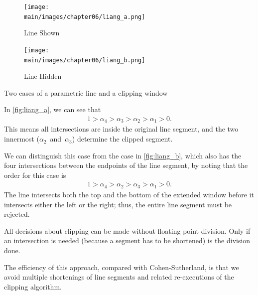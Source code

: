 \documentclass[../COS3712_Notes.tex]{subfiles}
\begin{document}
        \begin{example}
          \begin{center}
            \captionsetup{type=figure}
            \begin{subfigure}{0.4\linewidth}
              \texttt{[image: \\main/images/chapter06/liang\_a.png]}
              \caption{Line Shown}
              \label{fig:liang_a}
            \end{subfigure}
            \begin{subfigure}{0.4\linewidth}
              \texttt{[image: \\main/images/chapter06/liang\_b.png]}
              \caption{Line Hidden}
              \label{fig:liang_b}
            \end{subfigure}
            \caption{Two cases of a parametric line and a clipping window}
          \end{center}

          In \autoref{fig:liang_a}, we can see that
          \begin{align*}
            1 > \alpha_4 > \alpha_3 > \alpha_2 > \alpha_1 > 0.
          \end{align*}
          This means all intersections are inside the original line segment, and the two innermost
          ($\alpha_2$~and~$\alpha_3$) determine the clipped segment.

          We can distinguish this case from the case in \autoref{fig:liang_b},
          which also has the four intersections between the endpoints of the line segment,
          by noting that the order for this case is
          \begin{align*}
            1 > \alpha_4 > \alpha_2 > \alpha_3 > \alpha_1 > 0.
          \end{align*}
          The line intersects both the top and the bottom of the extended window before it
          intersects either the left or the right; thus, the entire line segment must be
          rejected.
        \end{example}

        All decisions about clipping can be made without floating point division.
        Only if an intersection is needed (because a segment has to be shortened)
        is the division done.

        The efficiency of this approach, compared with Cohen-Sutherland, is that we avoid
        multiple shortenings of line segments and related re-executions of the clipping
        algorithm.
\end{document}
